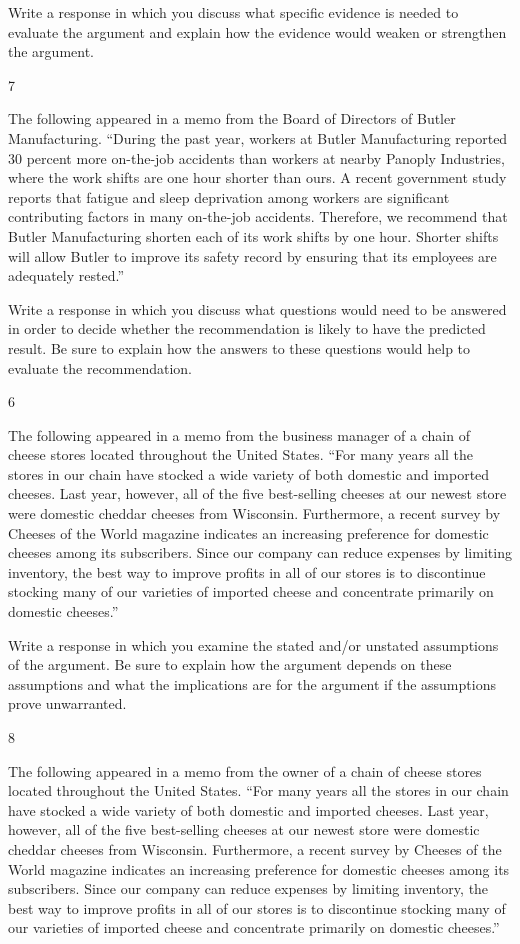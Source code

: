 \documentclass[]{article}
\begin{document}
Write a response in which you discuss what specific evidence is needed
to evaluate the argument and explain how the evidence would weaken or
strengthen the argument.

7

The following appeared in a memo from the Board of Directors of Butler
Manufacturing. ``During the past year, workers at Butler Manufacturing
reported 30 percent more on-the-job accidents than workers at nearby
Panoply Industries, where the work shifts are one hour shorter than
ours. A recent government study reports that fatigue and sleep
deprivation among workers are significant contributing factors in many
on-the-job accidents. Therefore, we recommend that Butler Manufacturing
shorten each of its work shifts by one hour. Shorter shifts will allow
Butler to improve its safety record by ensuring that its employees are
adequately rested.''

Write a response in which you discuss what questions would need to be
answered in order to decide whether the recommendation is likely to have
the predicted result. Be sure to explain how the answers to these
questions would help to evaluate the recommendation.

6

The following appeared in a memo from the business manager of a chain of
cheese stores located throughout the United States. ``For many years all
the stores in our chain have stocked a wide variety of both domestic and
imported cheeses. Last year, however, all of the five best-selling
cheeses at our newest store were domestic cheddar cheeses from
Wisconsin. Furthermore, a recent survey by Cheeses of the World magazine
indicates an increasing preference for domestic cheeses among its
subscribers. Since our company can reduce expenses by limiting
inventory, the best way to improve profits in all of our stores is to
discontinue stocking many of our varieties of imported cheese and
concentrate primarily on domestic cheeses.''

Write a response in which you examine the stated and/or unstated
assumptions of the argument. Be sure to explain how the argument depends
on these assumptions and what the implications are for the argument if
the assumptions prove unwarranted.

8

The following appeared in a memo from the owner of a chain of cheese
stores located throughout the United States. ``For many years all the
stores in our chain have stocked a wide variety of both domestic and
imported cheeses. Last year, however, all of the five best-selling
cheeses at our newest store were domestic cheddar cheeses from
Wisconsin. Furthermore, a recent survey by Cheeses of the World magazine
indicates an increasing preference for domestic cheeses among its
subscribers. Since our company can reduce expenses by limiting
inventory, the best way to improve profits in all of our stores is to
discontinue stocking many of our varieties of imported cheese and
concentrate primarily on domestic cheeses.''
\end{document}
